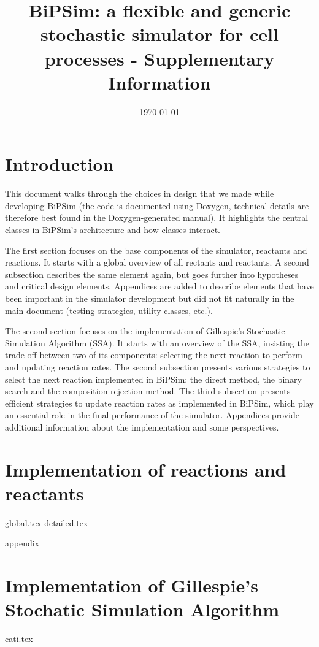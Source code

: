 \documentclass[12pt]{scrartcl}
\theoremstyle{definition}
\theoremstyle{remark}
\numberwithin{equation}{section}
\begin{document}
\title{BiPSim: a flexible and generic stochastic simulator for cell processes - Supplementary Information}%
\author{}%
\date{\today}%
\maketitle

\newpage

\tableofcontents

\newpage

\section{Introduction}

This document walks through the choices in design that we made while developing BiPSim
(the code is documented using Doxygen, technical details are therefore best found in the Doxygen-generated manual).
It highlights the central classes in BiPSim's architecture and how classes interact.

The first section focuses on the base components of the simulator, reactants and reactions.
It starts with a global overview of all rectants and reactants.
A second subsection describes the same element again,
but goes further into hypotheses and critical design elements.
Appendices are added to describe elements that have been important in the simulator development
but did not fit naturally in the main document (testing strategies, utility classes, etc.).

The second section focuses on the implementation of Gillespie's Stochastic Simulation Algorithm (SSA).
It starts with an overview of the SSA, insisting the trade-off between two of its
components: selecting the next reaction to perform and updating reaction rates.
The second subsection presents various strategies to select the next reaction implemented in BiPSim:
the direct method, the binary search and the composition-rejection method.
The third subsection presents efficient strategies to update reaction rates as implemented
in BiPSim, which play an essential role in the final performance of the simulator.
Appendices provide additional information about the implementation and some perspectives.

\section{Implementation of reactions and reactants}

{global.tex}
{detailed.tex}
\clearpage

{appendix}
\clearpage

\section{Implementation of Gillespie's Stochatic Simulation Algorithm}

{cati.tex}
\clearpage



\end{document}
